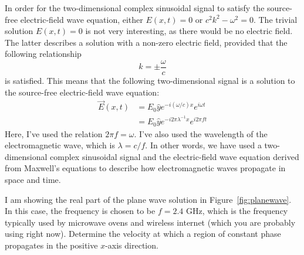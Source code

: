 In order for the two-dimensional complex sinusoidal signal to satisfy the source-free electric-field wave equation,
either $E(x,t)=0$ or $c^2k^2-\omega^2 = 0$.
The trivial solution $E(x,t)=0$ is not very interesting, as there would be no electric field.
The latter describes a solution with a non-zero electric field, provided that the following relationship
\begin{equation}
  k = \pm \frac{\omega}{c}
\end{equation}
is satisfied. This means that the following two-dimensional signal is a solution to the source-free electric-field wave equation:
\begin{align}
  \vec{E}(x,t) & = E_0 \hat{y} e^{-i (\omega/c) x} e^{i\omega t}         \\
               & = E_0 \hat{y} e^{-i 2\pi \lambda^{-1} x} e^{i 2\pi f t}
\end{align}
Here, I've used the relation $2\pi f = \omega$. I've also used the wavelength of the
electromagnetic wave, which is $\lambda = c/f$. In other words, we have used a two-dimensional
complex sinusoidal signal and the electric-field wave equation derived from Maxwell's
equations to describe how electromagnetic waves propagate in space and time.

I am showing the real part of the plane wave solution in
Figure~\ref{fig:planewave}. In this case, the frequency is chosen to
be $f=2.4$ GHz, which is the frequency typically used by microwave
ovens and wireless internet (which you are probably using right
now). Determine the velocity at which a region of constant phase
propagates in the positive $x$-axis direction.

